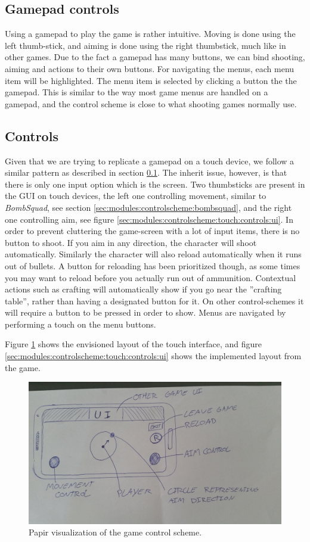 \subsection{Gamepad controls}\label{sec:modules:controlscheme:gamepad:controls}
Using a gamepad to play the game is rather intuitive. Moving is done using the left thumb-stick, and aiming is done using the right thumbstick, much like in other games.
Due to the fact a gamepad has many buttons, we can bind shooting, aiming and actions to their own buttons. 
For navigating the menus, each menu item will be highlighted. The menu item is selected by clicking a button the the gamepad.
This is similar to the way most game menus are handled on a gamepad, and the control scheme is close to what shooting games normally use.

\subsection{Controls}
Given that we are trying to replicate a gamepad on a touch device, we follow a similar pattern as described in section \ref{sec:modules:controlscheme:gamepad:controls}. The inherit issue, however, is that  there is only one input option which is the screen. 
Two thumbsticks are present in the GUI on touch devices, the left one controlling movement, similar to \textit{BombSquad}, see section \ref{sec:modules:controlscheme:bombsquad}, and the right one controlling aim, see figure \ref{sec:modules:controlscheme:touch:controls:ui}.
In order to prevent cluttering the game-screen with a lot of input items, there is no button to shoot. If you aim in any direction, the character will shoot automatically. Similarly the character will also reload  automatically when it runs out of bullets. A button for reloading has been prioritized though, as some times you may want to reload before you actually run out of ammunition.
Contextual actions such as crafting will automatically show if you go near the ''crafting table'', rather than having a designated button for it. On other control-schemes it will require a button to be pressed in order to show.
Menus are navigated by performing a touch on the menu buttons. 

Figure \ref{sec:modules:controlscheme:prototype} shows the envisioned layout of the touch interface, and figure \ref{sec:modules:controlscheme:touch:controls:ui} shows the implemented layout from the game.
\begin{figure}[H]
\centering
\includegraphics[width=.75\textwidth]{figures/controlscheme/prototype}
\caption{Papir visualization of the game control scheme.}
\label{sec:modules:controlscheme:prototype}
\end{figure}

